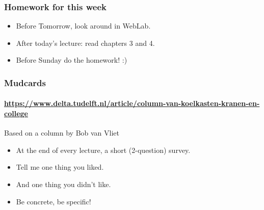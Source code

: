 
\begin{frame}
	\frametitle{Homework for this week}
	\begin{itemize}[<+->]
		\item \alert{Before} Tomorrow, look around in WebLab.
		\item \alert{After} today's lecture: read chapters 3 and 4.
		\item \alert{Before} Sunday do the homework! :)
	\end{itemize}
\end{frame}

\begin{frame}
	\frametitle{Mudcards}
	\framesubtitle{\url{https://www.delta.tudelft.nl/article/column-van-koelkasten-kranen-en-college}}

	\begin{block}{Based on a column by Bob van Vliet}
		\begin{itemize}
			\item At the end of every lecture, a short (2-question) survey.
			\item Tell me one thing you liked.
			\item And one thing you didn't like.
			\item Be concrete, be specific!
		\end{itemize}
	\end{block}
\end{frame}

